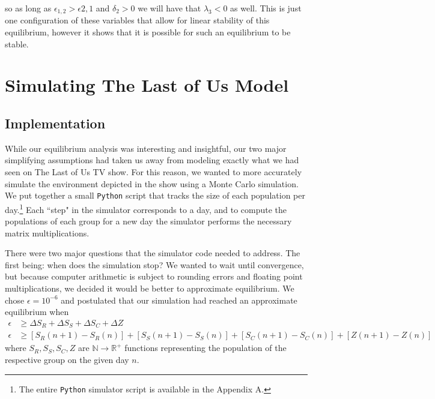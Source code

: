 \documentclass{article}
\begin{document}
so as long as $\epsilon_{1,2} > \epsilon{2,1}$ and $\delta_2 > 0$ we will have that $\lambda_3 < 0$ as well. This is just one configuration of these variables that allow for linear stability of this equilibrium, however it shows that it is possible for such an equilibrium to be stable.

\section{Simulating The Last of Us Model}

\subsection{Implementation}

While our equilibrium analysis was interesting and insightful, our two major simplifying assumptions had taken us away from modeling exactly what we had seen on The Last of Us TV show. For this reason, we wanted to more accurately simulate the environment depicted in the show using a Monte Carlo simulation. We put together a small \texttt{Python} script that tracks the size of each population per day.\footnote{The entire \texttt{Python} simulator script is available in the Appendix A.} Each ``step" in the simulator corresponds to a day, and to compute the populations of each group for a new day the simulator performs the necessary matrix multiplications.

There were two major questions that the simulator code needed to address. The first being: when does the simulation stop? We wanted to wait until convergence, but because computer arithmetic is subject to rounding errors and floating point multiplications, we decided it would be better to approximate equilibrium. We chose $\epsilon = 10^{-6}$ and postulated that our simulation had reached an approximate equilibrium when
\begin{align*}
    \epsilon &\geq \Delta S_R + \Delta S_S + \Delta S_C + \Delta Z \\
    \epsilon &\geq [S_R(n + 1) - S_R(n)] + [S_S(n + 1) - S_S(n)] + [S_C(n + 1) - S_C(n)] + [Z(n + 1) - Z(n)]
\end{align*}
where $S_R, S_S, S_C, Z$ are $\mathbb{N} \rightarrow \mathbb{R}^{+}$ functions representing the population of the respective group on the given day $n$.
\end{document}
